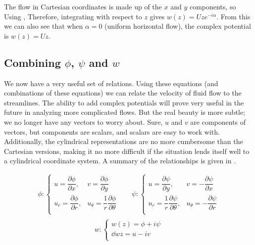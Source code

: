 \documentclass[12pt]{book}
\begin{document}
{The flow in Cartesian coordinates is made up of the $x$ and $y$ components, so
Using , 
Therefore, integrating with respect to $z$ gives $w(z) = Uze^{-i\alpha}$.  From this we can also see that when $\alpha=0$ (uniform horizontal flow), the complex potential is $w(z) = Uz$.
}

\subsection{Combining $\phi$, $\psi$ and $w$}
We now have a very useful set of relations.  Using these equations (and combinations of these equations) we can relate the velocity of fluid flow to the streamlines. The ability to add complex potentials will prove very useful in the future in analyzing more complicated flows.  But the real beauty is more subtle; we no longer have any vectors to worry about. Sure, $u$ and $v$ are components of vectors, but components are scalars, and scalars are easy to work with.  Additionally, the cylindrical representations are no more cumbersome than the Cartesian versions, making it no more difficult if the situation lends itself well to a cylindrical coordinate system.  A summary of the relationships is given in .

\renewcommand{\arraystretch}{2.5}
\begin{equation}\label{ClassicalTheoryBigSetofEquations}
\begin{array}{cc}
\phi:\left\{
\begin{array}{cc}
u=\dfrac{\partial \phi}{\partial x},  &  v= \dfrac{\partial \phi}{\partial y} \\
u_r = \dfrac{\partial \phi}{\partial r},  &  u_{\theta} = \dfrac{1}{r}\dfrac{\partial \phi}{\partial \theta} \\
\end{array}
\right.
&
\quad\psi:\left\{
\begin{array}{cc}
u=\dfrac{\partial \psi}{\partial y},  &  v= -\dfrac{\partial \psi}{\partial x} \\
u_r = \dfrac{1}{r}\dfrac{\partial \psi}{\partial \theta},  &  u_{\theta} = -\dfrac{\partial \psi}{\partial r} \\
\end{array}
\right.
\\
\end{array}
\end{equation}
\begin{equation*}
w:\left\{
\begin{array}{c}
w(z) = \phi + i\psi \\
\dd{w}{z} = u-iv \\
\end{array}
\right.
\end{equation*}
\end{document}
